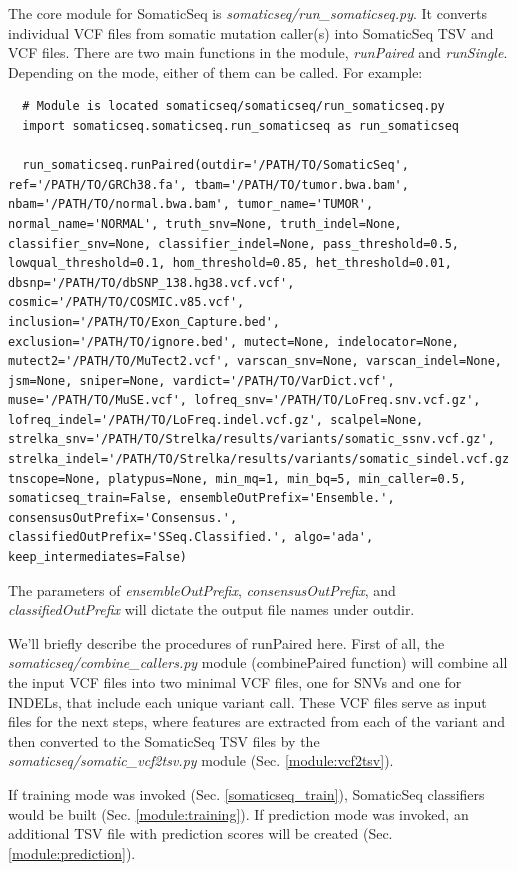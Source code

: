 \documentclass[10pt,letterpaper]{article}
\begin{document}
\begin{sloppypar}
The core module for SomaticSeq is \emph{somaticseq/run\_somaticseq.py}. It converts individual VCF files from somatic mutation caller(s) into SomaticSeq TSV and VCF files. There are two main functions in the module, \emph{runPaired} and \emph{runSingle}. Depending on the mode, either of them can be called. For example:

\begin{lstlisting}
  # Module is located somaticseq/somaticseq/run_somaticseq.py
  import somaticseq.somaticseq.run_somaticseq as run_somaticseq
  
  run_somaticseq.runPaired(outdir='/PATH/TO/SomaticSeq', ref='/PATH/TO/GRCh38.fa', tbam='/PATH/TO/tumor.bwa.bam', nbam='/PATH/TO/normal.bwa.bam', tumor_name='TUMOR', normal_name='NORMAL', truth_snv=None, truth_indel=None, classifier_snv=None, classifier_indel=None, pass_threshold=0.5, lowqual_threshold=0.1, hom_threshold=0.85, het_threshold=0.01, dbsnp='/PATH/TO/dbSNP_138.hg38.vcf.vcf', cosmic='/PATH/TO/COSMIC.v85.vcf', inclusion='/PATH/TO/Exon_Capture.bed', exclusion='/PATH/TO/ignore.bed', mutect=None, indelocator=None, mutect2='/PATH/TO/MuTect2.vcf', varscan_snv=None, varscan_indel=None, jsm=None, sniper=None, vardict='/PATH/TO/VarDict.vcf', muse='/PATH/TO/MuSE.vcf', lofreq_snv='/PATH/TO/LoFreq.snv.vcf.gz', lofreq_indel='/PATH/TO/LoFreq.indel.vcf.gz', scalpel=None, strelka_snv='/PATH/TO/Strelka/results/variants/somatic_ssnv.vcf.gz', strelka_indel='/PATH/TO/Strelka/results/variants/somatic_sindel.vcf.gz', tnscope=None, platypus=None, min_mq=1, min_bq=5, min_caller=0.5, somaticseq_train=False, ensembleOutPrefix='Ensemble.', consensusOutPrefix='Consensus.', classifiedOutPrefix='SSeq.Classified.', algo='ada', keep_intermediates=False)
\end{lstlisting}

The parameters of \emph{ensembleOutPrefix}, \emph{consensusOutPrefix}, and \emph{classifiedOutPrefix} will dictate the output file names under outdir.


We'll briefly describe the procedures of runPaired here. First of all, the \emph{somaticseq/combine\_callers.py} module (combinePaired function) will combine all the input VCF files into two minimal VCF files, one for SNVs and one for INDELs, that include each unique variant call. These VCF files serve as input files for the next steps, where features are extracted from each of the variant and then converted to the SomaticSeq TSV files by the \emph{somaticseq/somatic\_vcf2tsv.py} module (Sec. \ref{module:vcf2tsv}).

If training mode was invoked (Sec. \ref{somaticseq_train}), SomaticSeq classifiers would be built (Sec. \ref{module:training}). If prediction mode was invoked, an additional TSV file with prediction scores will be created (Sec. \ref{module:prediction}). 


\end{sloppypar}
\end{document}
